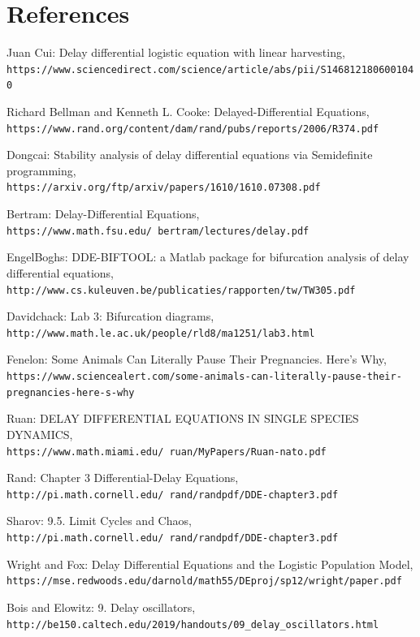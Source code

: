 \documentclass{article}
\begin{document}
\section{References}

\begin{thebibliography}{}
Juan Cui: Delay differential logistic equation with linear harvesting,
\\\texttt{https://www.sciencedirect.com/science/article/abs/pii/S1468121806001040}

Richard Bellman and Kenneth L. Cooke: Delayed-Differential Equations,
\\\texttt{https://www.rand.org/content/dam/rand/pubs/reports/2006/R374.pdf}

Dongcai: Stability analysis of delay differential equations via Semidefinite programming,
\\\texttt{https://arxiv.org/ftp/arxiv/papers/1610/1610.07308.pdf}

Bertram: Delay-Differential Equations,
\\\texttt{https://www.math.fsu.edu/~bertram/lectures/delay.pdf}

EngelBoghs: DDE-BIFTOOL: a Matlab package for bifurcation analysis of delay differential equations,
\\\texttt{http://www.cs.kuleuven.be/publicaties/rapporten/tw/TW305.pdf}

Davidchack: Lab 3: Bifurcation diagrams,
\\\texttt{http://www.math.le.ac.uk/people/rld8/ma1251/lab3.html}

Fenelon: Some Animals Can Literally Pause Their Pregnancies. Here's Why,
\\\texttt{https://www.sciencealert.com/some-animals-can-literally-pause-their-pregnancies-here-s-why}

Ruan: DELAY DIFFERENTIAL EQUATIONS IN SINGLE SPECIES DYNAMICS,
\\\texttt{https://www.math.miami.edu/~ruan/MyPapers/Ruan-nato.pdf}

Rand: Chapter 3 Differential-Delay Equations,
\\\texttt{http://pi.math.cornell.edu/~rand/randpdf/DDE-chapter3.pdf}

Sharov: 9.5. Limit Cycles and Chaos,
\\\texttt{http://pi.math.cornell.edu/~rand/randpdf/DDE-chapter3.pdf}

Wright and Fox: Delay Differential Equations and the Logistic Population Model,
\\\texttt{https://mse.redwoods.edu/darnold/math55/DEproj/sp12/wright/paper.pdf}

Bois and Elowitz: 9. Delay oscillators,
\\\texttt{http://be150.caltech.edu/2019/handouts/09_delay_oscillators.html}

\end{thebibliography}
\end{document}
